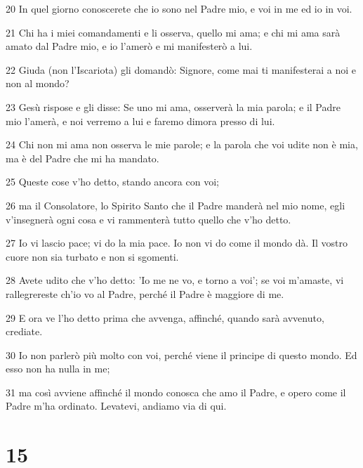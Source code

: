 \par 20 In quel giorno conoscerete che io sono nel Padre mio, e voi in me ed io in voi.
\par 21 Chi ha i miei comandamenti e li osserva, quello mi ama; e chi mi ama sarà amato dal Padre mio, e io l'amerò e mi manifesterò a lui.
\par 22 Giuda (non l'Iscariota) gli domandò: Signore, come mai ti manifesterai a noi e non al mondo?
\par 23 Gesù rispose e gli disse: Se uno mi ama, osserverà la mia parola; e il Padre mio l'amerà, e noi verremo a lui e faremo dimora presso di lui.
\par 24 Chi non mi ama non osserva le mie parole; e la parola che voi udite non è mia, ma è del Padre che mi ha mandato.
\par 25 Queste cose v'ho detto, stando ancora con voi;
\par 26 ma il Consolatore, lo Spirito Santo che il Padre manderà nel mio nome, egli v'insegnerà ogni cosa e vi rammenterà tutto quello che v'ho detto.
\par 27 Io vi lascio pace; vi do la mia pace. Io non vi do come il mondo dà. Il vostro cuore non sia turbato e non si sgomenti.
\par 28 Avete udito che v'ho detto: 'Io me ne vo, e torno a voi'; se voi m'amaste, vi rallegrereste ch'io vo al Padre, perché il Padre è maggiore di me.
\par 29 E ora ve l'ho detto prima che avvenga, affinché, quando sarà avvenuto, crediate.
\par 30 Io non parlerò più molto con voi, perché viene il principe di questo mondo. Ed esso non ha nulla in me;
\par 31 ma così avviene affinché il mondo conosca che amo il Padre, e opero come il Padre m'ha ordinato. Levatevi, andiamo via di qui.

\chapter{15}

